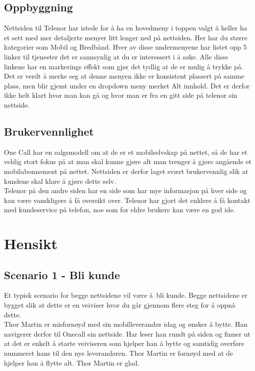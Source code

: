 \documentclass[a4paper, 10pt]{article}
\begin{document}
\subsection*{Oppbyggning}
Nettsiden til Telenor har istede for å ha en hovedmeny i toppen valgt å heller ha et sett med mer detaljerte menyer litt lenger ned på nettsiden. Her har du større kategorier som Mobil og Bredbånd. Hver av disse undermenyene har listet opp 5 linker til tjenester det er sannsynlig at du er interessert i å søke. Alle disse linkene har en markerings effekt som gjør det tydlig at de er mulig å trykke på. Det er verdt å merke seg at denne menyen ikke er konsistent plassert på samme plass, men blir gjemt under en dropdown meny merket Alt innhold. Det er derfor ikke helt klart hvor man kan gå og hvor man er fra en gitt side på telenor sin nettside.




\subsection*{Brukervennlighet}
One Call har en salgsmodell om at de er et mobilselvskap på nettet, så de har et veldig stort fokus på at man skal kunne gjøre alt man trenger å gjøre angående et mobilabonnement på nettet. Nettsiden er derfor laget svært brukervennlig slik at kundene skal klare å gjøre dette selv. \\

Telenor på den andre siden har en side som har mye informasjon på hver side og kan være vanskligere å få oversikt over. Telenor har gjort det enklere å få kontakt med kundeservice på telefon, noe som for eldre brukere kan være en god ide.

\section*{Hensikt}
\subsection*{Scenario 1 - Bli kunde}
Et typisk scenario for begge nettsidene vil være å bli kunde. Begge nettsidene er bygget slik at dette er en veiviser hvor du går gjennom flere steg for å oppnå dette.\\

Thor Martin er misfornøyd med sin mobilleverandør idag og ønsker å bytte. Han navigerer derfor til Onecall sin nettside. Har leser han rundt på siden og finner ut at det er enkelt å starte veiviseren som hjelper han å bytte og samtidig overføre nummeret hans til den nye leverandøren. Thor Martin er fornøyd med at de hjelper han å flytte alt. Thor Martin er glad.
\end{document}
